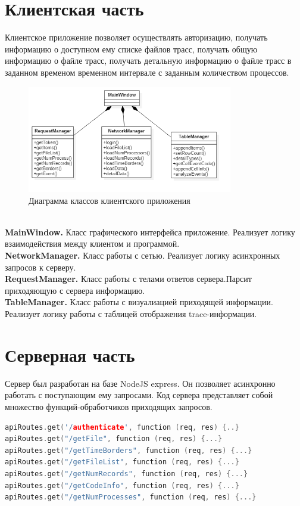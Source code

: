 \section{Клиентская часть}
Клиентское приложение позволяет осуществлять авторизацию, получать информацию о доступном ему списке файлов трасс, получать общую информацию о файле трасс, получать детальную информацию о файле трасс в заданном временом временном интервале с заданным количеством процессов.
\begin{figure}[h!]
	\centering
	\includegraphics[width=0.8\textwidth]{img/client.png}
	\caption{Диаграмма классов клиентского приложения}
	\label{fig:spire10}
\end{figure}
\\ \textbf{MainWindow.} Класс графического интерфейса приложение. Реализует логику взаимодействия между клиентом и программой.\\
\textbf{NetworkManager.} Класс работы с сетью. Реализует логику асинхронных запросов к серверу.\\
\textbf{RequestManager.} Класс работы с телами ответов сервера.Парсит приходяющую с сервера информацию. \\
\textbf{TableManager.} Класс работы с визуалиацией приходящей информации. Реализует логику работы с таблицей отображения trace-информации.
\section{Серверная часть}
Сервер был разработан на базе NodeJS express. Он позволяет асинхронно работать с поступающим ему запросами. Код сервера представляет собой множество функций-обработчиков приходящих запросов.
\begin{lstlisting}[language=c++]
apiRoutes.get('/authenticate', function (req, res) {..}
apiRoutes.get("/getFile", function (req, res) {...}
apiRoutes.get("/getTimeBorders", function (req, res) {...}
apiRoutes.get("/getFileList", function (req, res) {...}
apiRoutes.get("/getNumRecords", function (req, res) {...}
apiRoutes.get("/getCodeInfo", function (req, res) {...}
apiRoutes.get("/getNumProcesses", function (req, res) {...}
\end{lstlisting}

